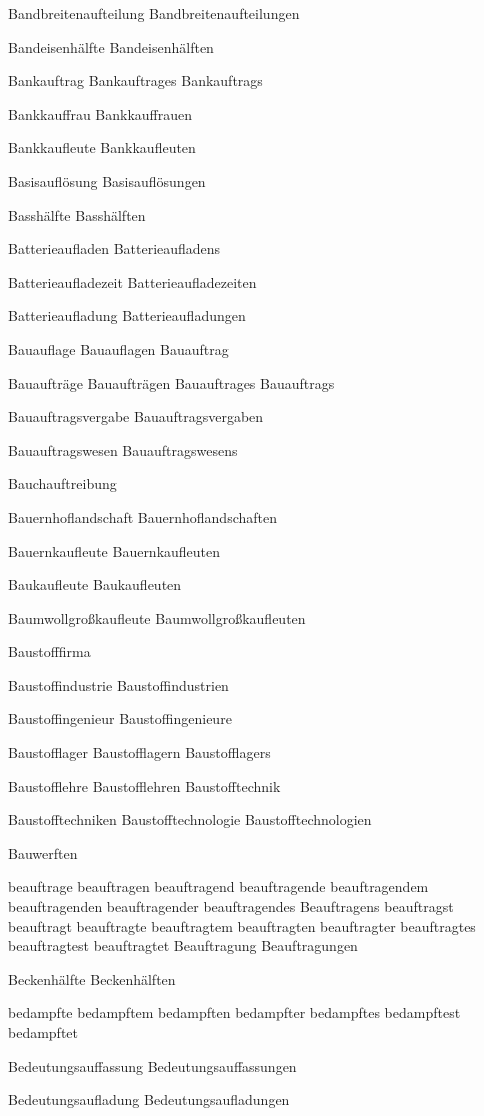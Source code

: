 Bandbreitenaufteilung
Bandbreitenaufteilungen

Bandeisenhälfte
Bandeisenhälften

Bankauftrag
Bankauftrages
Bankauftrags

Bankkauffrau
Bankkauffrauen

Bankkaufleute
Bankkaufleuten

Basisauflösung
Basisauflösungen

Basshälfte
Basshälften

Batterieaufladen
Batterieaufladens

Batterieaufladezeit
Batterieaufladezeiten

Batterieaufladung
Batterieaufladungen

Bauauflage
Bauauflagen
Bauauftrag

Bauaufträge
Bauaufträgen
Bauauftrages
Bauauftrags

Bauauftragsvergabe
Bauauftragsvergaben

Bauauftragswesen
Bauauftragswesens

Bauchauftreibung

Bauernhoflandschaft
Bauernhoflandschaften

Bauernkaufleute
Bauernkaufleuten

Baukaufleute
Baukaufleuten

Baumwollgroßkaufleute
Baumwollgroßkaufleuten

Baustofffirma

Baustoffindustrie
Baustoffindustrien

Baustoffingenieur
Baustoffingenieure

Baustofflager
Baustofflagern
Baustofflagers

Baustofflehre
Baustofflehren
Baustofftechnik

Baustofftechniken
Baustofftechnologie
Baustofftechnologien

Bauwerften

beauftrage
beauftragen
beauftragend
beauftragende
beauftragendem
beauftragenden
beauftragender
beauftragendes
Beauftragens
beauftragst
beauftragt
beauftragte
beauftragtem
beauftragten
beauftragter
beauftragtes
beauftragtest
beauftragtet
Beauftragung
Beauftragungen

Beckenhälfte
Beckenhälften

bedampfte
bedampftem
bedampften
bedampfter
bedampftes
bedampftest
bedampftet

Bedeutungsauffassung
Bedeutungsauffassungen

Bedeutungsaufladung
Bedeutungsaufladungen

